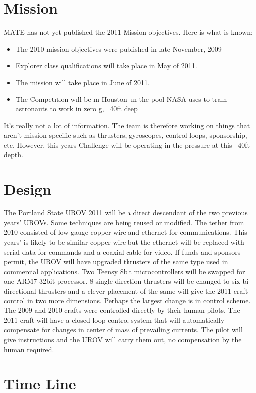 \documentclass{proposalnsf}
\begin{document}
\section{Mission}

MATE has not yet published the 2011 Mission objectives. Here is what is known:
\begin{itemize}
\item The 2010 mission objectives were published in late November, 2009
\item Explorer class qualifications will take place in May of 2011.
\item The mission will take place in June of 2011.
\item The Competition will be in Houston, in the pool NASA uses to train astronauts to work in zero g, ~40ft deep
\end{itemize}
It's really not a lot of information. The team is therefore working on things that aren't mission specific such as thrusters, gyroscopes, control loops, sponsorship, etc.
However, this years Challenge will be operating in the pressure at this ~40ft depth.


\section{Design}

The Portland State UROV 2011 will be a direct descendant of the two previous years' UROVs. Some techniques are being reused or modified. The tether from 2010 consisted of low gauge copper
 wire and ethernet for communications. This years' is likely to be similar copper wire but the ethernet will be replaced with serial data for commands and a coaxial cable for video. If
 funds and sponsors permit, the UROV will have upgraded thrusters of the same type used in commercial applications. Two Teensy 8bit microcontrollers will be swapped for one ARM7 32bit processor.
8 single direction thrusters will be changed to six bi-directional thrusters and a clever placement of the same will give the 2011 craft control in two more dimensions. 
Perhaps the largest change is in control scheme. The 2009 and 2010 crafts were controlled directly by their human pilots. The 2011 craft will have a closed loop control system that will automatically compensate for changes in center of mass of prevailing currents. The pilot will give instructions and the UROV will carry them out, no compensation by the human required. 


\section{Time Line}
\end{document}
